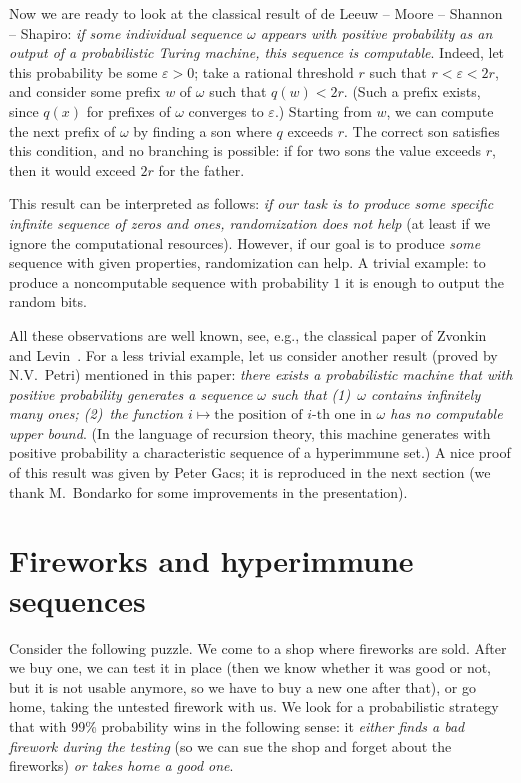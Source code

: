 \documentclass[12pt]{article}
\begin{document}
Now we are ready to look at the classical result of de Leeuw -- Moore -- Shannon -- Shapiro: \emph{if some individual sequence $\omega$ appears with positive probability as an output of a probabilistic Turing machine, this sequence is computable}. Indeed, let this probability be some $\varepsilon>0$; take a rational threshold $r$ such that $r<\varepsilon<2r$, and consider some prefix $w$ of $\omega$ such that $q(w)<2r$. (Such a prefix exists, since $q(x)$ for prefixes of $\omega$ converges to $\varepsilon$.)
Starting from $w$, we can compute the next prefix of $\omega$ by finding a son where $q$ exceeds $r$. The correct son satisfies this condition, and no branching is possible: if for two sons the value exceeds $r$, then it would exceed $2r$ for the father.

This result can be interpreted as follows: \emph{if our task is to produce some specific infinite sequence of zeros and ones, randomization does not help} (at least if we ignore the computational resources). However, if our goal is to produce \emph{some} sequence with given properties, randomization can help. A trivial example: to produce a noncomputable sequence with probability $1$ it is enough to output the random bits.

All these observations are well known, see, e.g., the classical paper of Zvonkin and Levin~\cite{zvonkin-levin}. For a less trivial example, let us consider another result (proved by N.V.~Pet\-ri) mentioned in this paper: \emph{there exists a probabilistic machine that with positive probability generates a sequence $\omega$ such that \textup{(1)}~$\omega$ contains infinitely many ones; \textup{(2)}~the function $i\mapsto\text{the position of $i$-th one in $\omega$}$ has no computable upper bound}. (In the language of recursion theory, this machine generates with positive probability a characteristic sequence of a hyperimmune set.) A nice proof of this result was given by Peter Gacs; it is reproduced in the next section (we thank M.~Bondarko for some improvements in the presentation).

\section{Fireworks and hyperimmune sequences}

Consider the following puzzle. We come to a shop where fireworks are sold. After we buy one, we can test it in place (then we know whether it was good or not, but it is not usable anymore, so we have to buy a new one after that), or go home, taking the untested firework with us. We look for a probabilistic strategy that with 99\% probability wins in the following sense: it \emph{either finds a bad firework during the testing} (so we can sue the shop and forget about the fireworks) \emph{or takes home a good one}.
\end{document}
